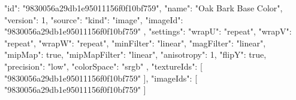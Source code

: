 {
  "id": "9830056a29db1e95011156f0f10bf759",
  "name": "Oak Bark Base Color",
  "version": 1,
  "source": {
    "kind": "image",
    "imageId": "9830056a29db1e95011156f0f10bf759"
  },
  "settings": {
    "wrapU": "repeat",
    "wrapV": "repeat",
    "wrapW": "repeat",
    "minFilter": "linear",
    "magFilter": "linear",
    "mipMap": true,
    "mipMapFilter": "linear",
    "anisotropy": 1,
    "flipY": true,
    "precision": "low",
    "colorSpace": "srgb"
  },
  "textureIds": [
    "9830056a29db1e95011156f0f10bf759"
  ],
  "imageIds": [
    "9830056a29db1e95011156f0f10bf759"
  ]
}
